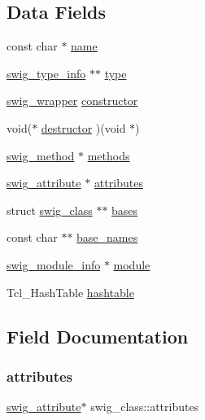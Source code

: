 \subsection*{Data Fields}
\begin{DoxyCompactItemize}
\item 
const char $\ast$ \hyperlink{structswig__class_a4f5616c467aa85a1ee98302174a9a274}{name}
\item 
\hyperlink{structswig__type__info}{swig\+\_\+type\+\_\+info} $\ast$$\ast$ \hyperlink{structswig__class_ad003f6193cbabe3b78293db9914bc3e6}{type}
\item 
\hyperlink{pdnsim__wrap_8cpp_a26e4d1918011eb5b4aa36f67e1d5a318}{swig\+\_\+wrapper} \hyperlink{structswig__class_a943365b5944f3beb08271d297475da3f}{constructor}
\item 
void($\ast$ \hyperlink{structswig__class_a7b990b9ef92362180df695db37f1fb2a}{destructor} )(void $\ast$)
\item 
\hyperlink{structswig__method}{swig\+\_\+method} $\ast$ \hyperlink{structswig__class_ad4a9ded260af27126bd0e2ec70b651c2}{methods}
\item 
\hyperlink{structswig__attribute}{swig\+\_\+attribute} $\ast$ \hyperlink{structswig__class_a2a73cdf08c947e5ecce4138c0f9b69f1}{attributes}
\item 
struct \hyperlink{structswig__class}{swig\+\_\+class} $\ast$$\ast$ \hyperlink{structswig__class_a8208d113d09eb3f2774ef7ff8b1b1308}{bases}
\item 
const char $\ast$$\ast$ \hyperlink{structswig__class_a3e98c300724371a0fcffed2293a54f9c}{base\+\_\+names}
\item 
\hyperlink{structswig__module__info}{swig\+\_\+module\+\_\+info} $\ast$ \hyperlink{structswig__class_ac8105783928c259f2b79e1329afbdcdb}{module}
\item 
Tcl\+\_\+\+Hash\+Table \hyperlink{structswig__class_a507bd16a0168767b18cd40a9be9d7516}{hashtable}
\end{DoxyCompactItemize}


\subsection{Field Documentation}
\mbox{\label{structswig__class_a2a73cdf08c947e5ecce4138c0f9b69f1}} 
\subsubsection{\texorpdfstring{attributes}{attributes}}
{\footnotesize\ttfamily \hyperlink{structswig__attribute}{swig\+\_\+attribute}$\ast$ swig\+\_\+class\+::attributes}

